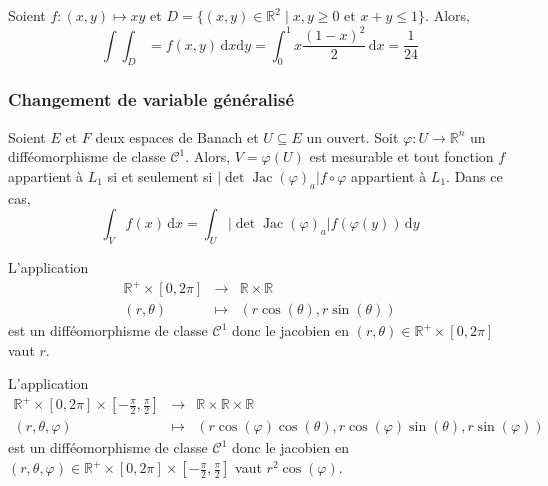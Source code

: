
  \begin{example}
    Soient $f : (x,y) \mapsto xy$ et $D = \{ (x,y) \in \mathbb{R}^2 \mid x, y \geq 0 \text{ et } x + y \leq 1 \}$. Alors,
    \[ \int \int_D = f(x,y) \, \mathrm{d}x \mathrm{d}y = \int_0^1 x \frac{(1-x)^2}{2} \, \mathrm{d}x = \frac{1}{24} \]
  \end{example}

  \subsubsection{Changement de variable généralisé}


  \begin{theorem}
    Soient $E$ et $F$ deux espaces de Banach et $U \subseteq E$ un ouvert.
    Soit $\varphi : U \rightarrow \mathbb{R}^n$ un difféomorphisme de classe $\mathcal{C}^1$. Alors, $V = \varphi(U)$ est mesurable et tout fonction $f$ appartient à $L_1$ si et seulement si $\vert \det \operatorname{Jac}(\varphi)_a \vert f \circ \varphi$ appartient à $L_1$. Dans ce cas,
    \[ \int_V f(x) \, \mathrm{d}x = \int_U \vert \det \operatorname{Jac}(\varphi)_a \vert f (\varphi(y)) \, \mathrm{d}y \]
  \end{theorem}


  \begin{example}
    L'application
    \[
      \begin{array}{ccc}
        \mathbb{R}^+ \times [0,2\pi] &\rightarrow& \mathbb{R} \times \mathbb{R} \\
        (r,\theta) &\mapsto& (r\cos(\theta), r\sin(\theta))
      \end{array}
    \]
    est un difféomorphisme de classe $\mathcal{C}^1$ donc le jacobien en $(r,\theta) \in \mathbb{R}^+ \times [0,2\pi]$ vaut $r$.
  \end{example}

  \begin{example}
    L'application
    \[
      \begin{array}{ccc}
        \mathbb{R}^+ \times [0,2\pi] \times \left[ -\frac{\pi}{2}, \frac{\pi}{2} \right] &\rightarrow& \mathbb{R} \times \mathbb{R} \times \mathbb{R} \\
        (r,\theta,\varphi) &\mapsto& (r\cos(\varphi)\cos(\theta), r\cos(\varphi)\sin(\theta), r\sin(\varphi))
      \end{array}
    \]
    est un difféomorphisme de classe $\mathcal{C}^1$ donc le jacobien en $(r,\theta,\varphi) \in \mathbb{R}^+ \times [0,2\pi] \times \left[ -\frac{\pi}{2}, \frac{\pi}{2} \right]$ vaut $r^2 \cos(\varphi)$.
  \end{example}

